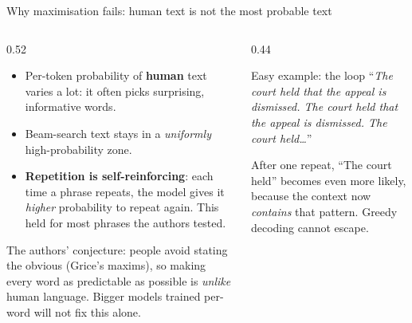 \documentclass[aspectratio=169,11pt]{beamer}
\begin{document}
\begin{frame}{Why maximisation fails: human text is not the most probable text}
  \begin{columns}[T]
    \begin{column}{0.52\textwidth}
      \small
      \begin{itemize}
        \item Per-token probability of \textbf{human} text varies a lot: it often picks surprising, informative words.
        \item Beam-search text stays in a \emph{uniformly} high-probability zone.
        \item \textbf{Repetition is self-reinforcing}: each time a phrase repeats, the model gives it \emph{higher} probability to repeat again. This held for most phrases the authors tested.
      \end{itemize}
      \vspace{1mm}
      The authors' conjecture: people avoid stating the obvious (Grice's maxims), so making every word as predictable as possible is \emph{unlike} human language. Bigger models trained per-word will not fix this alone.
    \end{column}
    \begin{column}{0.44\textwidth}
      \begin{exampleblock}{Easy example: the loop}
        \small
        ``\emph{The court held that the appeal is dismissed. The court held that the appeal is dismissed. The court held\ldots}''
        \vspace{1mm}

        After one repeat, ``The court held'' becomes even more likely, because the context now \emph{contains} that pattern. Greedy decoding cannot escape.
      \end{exampleblock}
    \end{column}
  \end{columns}
\end{frame}
\end{document}
